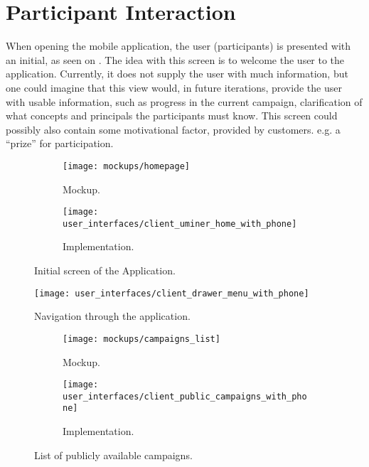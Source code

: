 
\section{Participant Interaction}

When opening the mobile application, the user (participants) is presented with an initial, as seen on . The idea with this screen is to welcome the user to the application. Currently, it does not supply the user with much information, but one could imagine that this view would, in future iterations, provide the user with usable information, such as progress in the current campaign, clarification of what concepts and principals the participants must know. This screen could possibly also contain some motivational factor, provided by customers. e.g. a ``prize'' for participation.  

\begin{figure}
\begin{subfigure}[!t]{.48\textwidth}
  \centering
  \texttt{[image: mockups/homepage]}
  \caption{Mockup.}
  \label{fig:mockup_initial_screen}
\end{subfigure}%
\begin{subfigure}[!t]{.52\textwidth}
  \centering
  \texttt{[image: user\_interfaces/client\_uminer\_home\_with\_phone]}
  \caption{Implementation.}
  \label{fig:implementation_initial_screen}
\end{subfigure}
\caption{Initial screen of the Application.}
\label{fig:initial_screen}
\end{figure}
\FloatBarrier

\begin{figure}
\centering
\texttt{[image: user\_interfaces/client\_drawer\_menu\_with\_phone]}
\caption{Navigation through the application.}
\label{fig:navigation}
\end{figure}
\FloatBarrier

\begin{figure}
\begin{subfigure}[!t]{.48\textwidth}
  \centering
  \texttt{[image: mockups/campaigns\_list]}
  \caption{Mockup.}
  \label{fig:mockup_public_campaigns}
\end{subfigure}%
\begin{subfigure}[!t]{.52\textwidth}
  \centering
  \texttt{[image: user\_interfaces/client\_public\_campaigns\_with\_phone]}
  \caption{Implementation.}
  \label{fig:implementation_public_campaigns}
\end{subfigure}
\caption{List of publicly available campaigns.}
\label{fig:public_campaigns}
\end{figure}
\FloatBarrier

